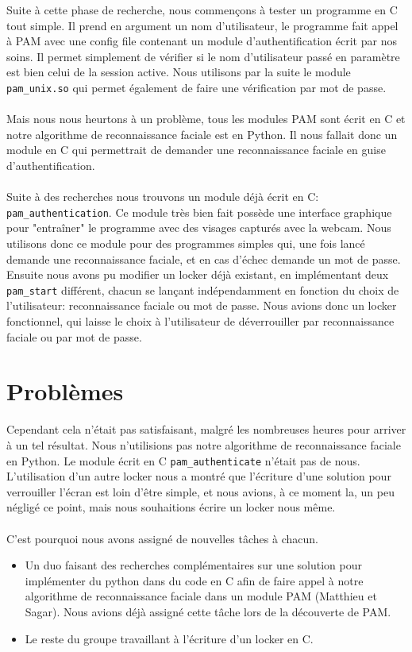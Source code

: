 \documentclass{article}
\begin{document}
  Suite à cette phase de recherche, nous commençons à tester un programme en C
  tout simple. Il prend en argument un nom d’utilisateur, le programme fait
  appel à PAM avec une config file contenant un module d’authentification écrit
  par nos soins. Il permet simplement de vérifier si le nom d’utilisateur passé
  en paramètre est bien celui de la session active. Nous utilisons par la suite
  le module \texttt{pam\_unix.so} qui permet également de faire une
  vérification par mot de passe.
\\ \\
  Mais nous nous heurtons à un problème, tous les modules PAM sont écrit en C
  et notre algorithme de reconnaissance faciale est en Python. Il nous fallait
  donc un module en C qui permettrait de demander une reconnaissance faciale en
  guise d’authentification.
\\ \\
  Suite à des recherches nous trouvons un module déjà écrit en C:
  \texttt{pam\_authentication}. Ce module très bien fait possède une interface
  graphique pour "entraîner" le programme avec des visages capturés avec la webcam. Nous
  utilisons donc ce module pour des programmes simples qui, une fois lancé
  demande une reconnaissance faciale, et en cas d’échec demande un mot de
  passe. Ensuite nous avons pu modifier un locker déjà existant, en
  implémentant deux \texttt{pam\_start} différent, chacun se lançant
  indépendamment en fonction du choix de l’utilisateur: reconnaissance faciale
  ou mot de passe. Nous avions donc un locker fonctionnel, qui laisse le choix à
  l’utilisateur de déverrouiller par reconnaissance faciale ou par mot de
  passe.

  \section{Problèmes}

  Cependant cela n’était pas satisfaisant, malgré les nombreuses heures pour
  arriver à un tel résultat. Nous n’utilisions pas notre algorithme de
  reconnaissance faciale en Python. Le module écrit en C
  \texttt{pam\_authenticate} n’était pas de nous. L’utilisation d’un autre
  locker nous a montré que l’écriture d’une solution pour verrouiller l’écran
  est loin d’être simple, et nous avions, à ce moment la, un peu négligé ce
  point, mais nous souhaitions écrire un locker nous même.
\\ \\
  C’est pourquoi nous avons assigné de nouvelles tâches à chacun.
  \begin{itemize}
    \item{Un duo faisant des recherches complémentaires sur une
  solution pour implémenter du python dans du code en C afin de faire appel à
  notre algorithme de reconnaissance faciale dans un module PAM (Matthieu et
  Sagar). Nous avions déjà assigné cette tâche lors de la découverte de PAM.}
    \item{Le reste du groupe travaillant à l’écriture d’un locker en C.}
  \end{itemize}
\end{document}
